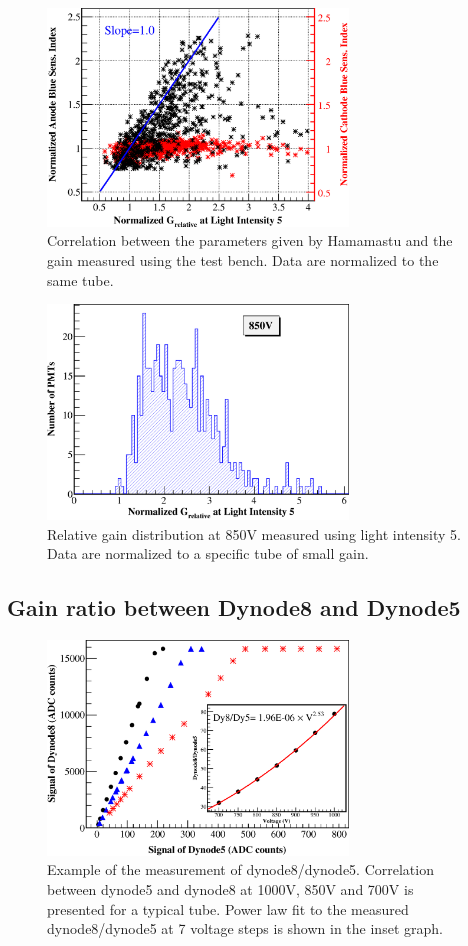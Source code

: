 \documentclass[5p, times]{elsarticle}
\begin{document}
\begin{figure}
 \centering
 \includegraphics[width=80mm]{correlation_new}
\caption{Correlation between the parameters given by Hamamastu and the gain measured using the test bench.
Data are normalized to the same tube.}
\label{fig:gain_correlation}
\end{figure} 

\begin{figure}
 \centering
 \includegraphics[width=80mm]{GainDist}
\caption{Relative gain distribution at 850V measured using light intensity 5.
Data are normalized to a specific tube of small gain.}
\label{fig:gain_dist}
\end{figure}

\subsection{Gain ratio between Dynode8 and Dynode5}
\label{sec:psd_dy58}

\begin{figure}
 \centering
 \includegraphics[width=80mm]{dy58_example}
\caption{Example of the measurement of dynode8/dynode5.
Correlation between dynode5 and dynode8 at 1000V, 850V and 700V is presented for a typical tube.
Power law fit to the measured dynode8/dynode5 at 7 voltage steps is shown in the inset graph.
}
\label{fig:dy58_example}
\end{figure} 
\end{document}
